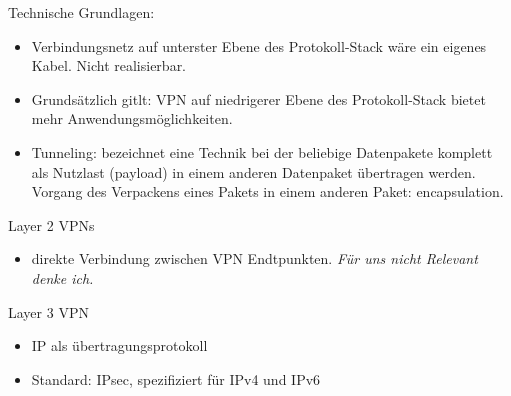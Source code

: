Technische Grundlagen: 
\begin{itemize}
\item Verbindungsnetz auf unterster Ebene des Protokoll-Stack wäre ein eigenes Kabel. Nicht realisierbar.
\item Grundsätzlich gitlt: VPN auf niedrigerer Ebene des Protokoll-Stack bietet mehr Anwendungsmöglichkeiten.
\item Tunneling: bezeichnet eine Technik bei der beliebige Datenpakete komplett als Nutzlast (payload) in einem anderen Datenpaket übertragen werden. Vorgang des Verpackens eines Pakets in einem anderen Paket: encapsulation.	
\end{itemize}
Layer 2 VPNs
\begin {itemize}
\item direkte Verbindung zwischen VPN Endtpunkten. \textit{Für uns nicht Relevant denke ich.}	
\end {itemize}
Layer 3 VPN
\begin{itemize}
\item IP als übertragungsprotokoll
\item Standard: IPsec, spezifiziert für IPv4 und IPv6	
\end{itemize}



